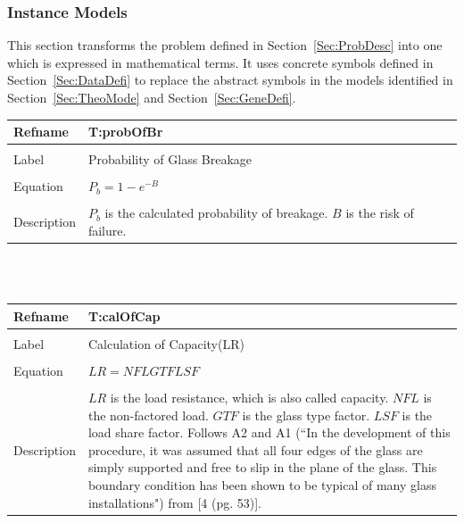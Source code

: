 \documentclass[12pt]{article}
\begin{document}
\subsubsection{Instance Models}
\label{Sec:InstMode}
This section transforms the problem defined in Section~\ref{Sec:ProbDesc} into one which is expressed in mathematical terms. It uses concrete symbols defined in Section~\ref{Sec:DataDefi} to replace the abstract symbols in the models identified in Section~\ref{Sec:TheoMode} and Section~\ref{Sec:GeneDefi}.
~\newline
\noindent \begin{minipage}{\textwidth}
\begin{tabular}{p{} p{}}
\toprule \textbf{Refname} & \textbf{T:probOfBr}
\label{T:probOfBr}
\\ \midrule \\
Label & Probability of Glass Breakage
\\ \midrule \\
Equation & ${P_{b}}=1-e^{-B}$
\\ \midrule \\
Description & ${P_{b}}$ is the calculated probability of breakage. $B$ is the risk of failure.
\\ \bottomrule \end{tabular}
\end{minipage}\\
~\newline
\noindent \begin{minipage}{\textwidth}
\begin{tabular}{p{} p{}}
\toprule \textbf{Refname} & \textbf{T:calOfCap}
\label{T:calOfCap}
\\ \midrule \\
Label & Calculation of Capacity(LR)
\\ \midrule \\
Equation & $LR=NFL GTF LSF$
\\ \midrule \\
Description & $LR$ is the load resistance, which is also called capacity. $NFL$ is the non-factored load. $GTF$ is the glass type factor. $LSF$ is the load share factor. Follows A2 and A1 (``In the development of this procedure, it was assumed that all four edges of the glass are simply supported and free to slip in the plane of the glass. This boundary condition has been shown to be typical of many glass installations") from [4 (pg. 53)].
\\ \bottomrule \end{tabular}
\end{minipage}\\
\end{document}
